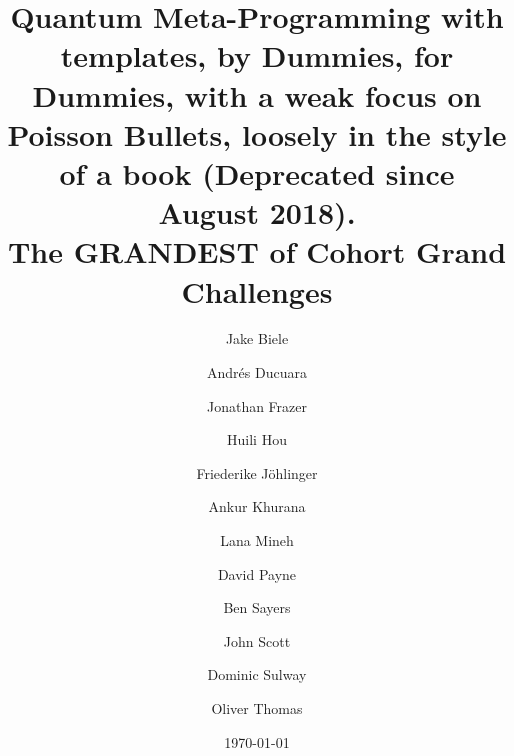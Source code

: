 \documentclass[12pt]{book}
\begin{document}

\title{\bf Quantum Meta-Programming with templates, by Dummies, for Dummies, with a weak focus on Poisson Bullets, loosely in the style of a book (Deprecated since August 2018). \\ {\large The {\LARGE GRANDEST} of Cohort Grand Challenges}}


\author[ ]{Jake Biele}
\author[ ]{Andrés Ducuara}
\author[ ]{Jonathan Frazer}
\author[ ]{Huili Hou}
\author[ ]{Friederike Jöhlinger}
\author[ ]{Ankur Khurana}
\author[ ]{Lana Mineh}
\author[ ]{David Payne}
\author[ ]{Ben Sayers}
\author[ ]{John Scott}
\author[ ]{Dominic Sulway}
\author[ ]{Oliver Thomas}

\begin{comment} %
\author[ ]{J. Biele}
\author[ ]{A. Ducuara}
\author[ ]{J. Frasure}
\author[ ]{H. Hou}
\author[ ]{F. Jöhlinger}
\author[ ]{A. Khurana}
\author[ ]{L. Mineh}
\author[ ]{D. Payne}
\author[ ]{B. Sayers}
\author[ ]{J. Scott}
\author[ ]{D. Sulway}
\author[ ]{O. Thomas}

\affil[ ]{ {\small Quantum Engineering Technology Labs, H. H. Wills Physics Laboratory and \\ Department of Electrical \& Electronic Engineering, University of Bristol, BS8 1FD, UK}}
\end{comment}
\date{\today}
\maketitle

\tableofcontents







\printnomenclature
\end{document}
